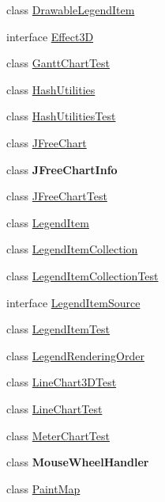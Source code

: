 \begin{DoxyCompactItemize}
\item 
class \mbox{\hyperlink{classorg_1_1jfree_1_1chart_1_1_drawable_legend_item}{Drawable\+Legend\+Item}}
\item 
interface \mbox{\hyperlink{interfaceorg_1_1jfree_1_1chart_1_1_effect3_d}{Effect3D}}
\item 
class \mbox{\hyperlink{classorg_1_1jfree_1_1chart_1_1_gantt_chart_test}{Gantt\+Chart\+Test}}
\item 
class \mbox{\hyperlink{classorg_1_1jfree_1_1chart_1_1_hash_utilities}{Hash\+Utilities}}
\item 
class \mbox{\hyperlink{classorg_1_1jfree_1_1chart_1_1_hash_utilities_test}{Hash\+Utilities\+Test}}
\item 
class \mbox{\hyperlink{classorg_1_1jfree_1_1chart_1_1_j_free_chart}{J\+Free\+Chart}}
\item 
class {\bfseries J\+Free\+Chart\+Info}
\item 
class \mbox{\hyperlink{classorg_1_1jfree_1_1chart_1_1_j_free_chart_test}{J\+Free\+Chart\+Test}}
\item 
class \mbox{\hyperlink{classorg_1_1jfree_1_1chart_1_1_legend_item}{Legend\+Item}}
\item 
class \mbox{\hyperlink{classorg_1_1jfree_1_1chart_1_1_legend_item_collection}{Legend\+Item\+Collection}}
\item 
class \mbox{\hyperlink{classorg_1_1jfree_1_1chart_1_1_legend_item_collection_test}{Legend\+Item\+Collection\+Test}}
\item 
interface \mbox{\hyperlink{interfaceorg_1_1jfree_1_1chart_1_1_legend_item_source}{Legend\+Item\+Source}}
\item 
class \mbox{\hyperlink{classorg_1_1jfree_1_1chart_1_1_legend_item_test}{Legend\+Item\+Test}}
\item 
class \mbox{\hyperlink{classorg_1_1jfree_1_1chart_1_1_legend_rendering_order}{Legend\+Rendering\+Order}}
\item 
class \mbox{\hyperlink{classorg_1_1jfree_1_1chart_1_1_line_chart3_d_test}{Line\+Chart3\+D\+Test}}
\item 
class \mbox{\hyperlink{classorg_1_1jfree_1_1chart_1_1_line_chart_test}{Line\+Chart\+Test}}
\item 
class \mbox{\hyperlink{classorg_1_1jfree_1_1chart_1_1_meter_chart_test}{Meter\+Chart\+Test}}
\item 
class {\bfseries Mouse\+Wheel\+Handler}
\item 
class \mbox{\hyperlink{classorg_1_1jfree_1_1chart_1_1_paint_map}{Paint\+Map}}
\item 

\end{DoxyCompactItemize}
